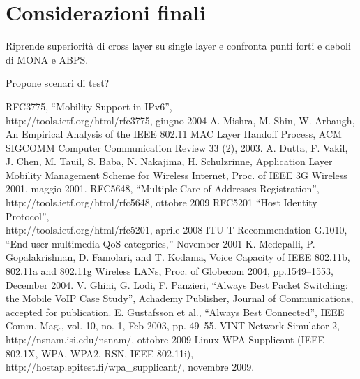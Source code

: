 \documentclass[12pt,a4paper,openright,twoside]{book}
\begin{document}
\clearpage{\pagestyle{empty}\cleardoublepage}


\chapter{Considerazioni finali}
Riprende superiorità di cross layer su single layer e confronta punti
forti e deboli di MONA e ABPS.

Propone scenari di test?

\clearpage{\pagestyle{empty}\cleardoublepage}



\begin{thebibliography}{90}
\rhead[\fancyplain{}{\bfseries \leftmark}]{\fancyplain{}{\bfseries
\thepage}}
 RFC3775, ``Mobility Support in IPv6'',\\
  http://tools.ietf.org/html/rfc3775, giugno 2004
 A. Mishra, M. Shin, W. Arbaugh, An
  Empirical Analysis of the IEEE 802.11 MAC Layer Handoff Process, ACM
  SIGCOMM Computer Communication Review 33 (2), 2003.
 A. Dutta, F. Vakil, J. Chen,
  M. Tauil, S. Baba, N. Nakajima, H.  Schulzrinne, Application Layer
  Mobility Management Scheme for Wireless Internet, Proc. of IEEE 3G
  Wireless 2001, maggio 2001.
 RFC5648, ``Multiple Care-of Addresses
  Registration'',\\http://tools.ietf.org/html/rfc5648, ottobre 2009
 RFC5201 ``Host Identity Protocol'',\\
  http://tools.ietf.org/html/rfc5201, aprile 2008
 ITU-T Recommendation G.1010, “End-user multimedia
  QoS categories,” November 2001
 K. Medepalli, P. Gopalakrishnan, D. Famolari,
  and T. Kodama, Voice Capacity of IEEE 802.11b, 802.11a and 802.11g
  Wireless LANs, Proc. of Globecom 2004, pp.1549–1553, December 2004.
 V. Ghini, G. Lodi, F. Panzieri, ``Always Best
  Packet Switching: the Mobile VoIP Case Study'', Achademy Publisher,
  Journal of Communications, accepted for publication.
 E. Gustafsson et al., ``Always Best Connected'',
  IEEE Comm. Mag., vol. 10, no. 1, Feb 2003, pp. 49--55.
 VINT Network Simulator 2,
  http://nsnam.isi.edu/nsnam/, ottobre 2009
 Linux WPA Supplicant (IEEE 802.1X, WPA,
  WPA2, RSN, IEEE 802.11i), http://hostap.epitest.fi/wpa\_supplicant/,
  novembre 2009.
\end{thebibliography}
\end{document}
